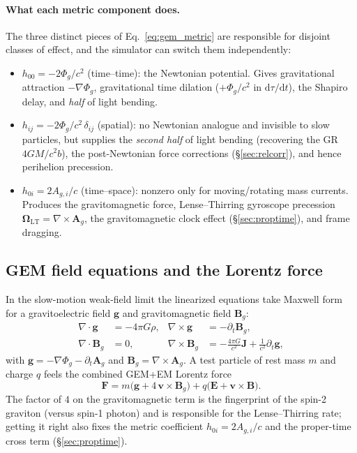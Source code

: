 \documentclass[11pt]{article}
\newcommand{\Phig}{\Phi_g}                 %
\newcommand{\Ag}{\mathbf{A}_g}             %
\newcommand{\vv}[1]{\mathbf{#1}}           %
\newcommand{\dd}{\mathrm{d}}               %
\newcommand{\Bg}{\vv{B}_g}
\begin{document}
\paragraph{What each metric component does.}
The three distinct pieces of Eq.~\eqref{eq:gem_metric} are responsible for
disjoint classes of effect, and the simulator can switch them independently:
\begin{itemize}
  \item $h_{00}=-2\Phig/c^2$ (time--time): the Newtonian potential. Gives
  gravitational attraction $-\nabla\Phig$, gravitational time dilation
  ($+\Phig/c^2$ in $\dd\tau/\dd t$), the Shapiro delay, and \emph{half} of
  light bending.
  \item $h_{ij}=-2\Phig/c^2\,\delta_{ij}$ (spatial): no Newtonian analogue and
  invisible to slow particles, but supplies the \emph{second half} of light
  bending (recovering the GR $4GM/c^2 b$), the post-Newtonian force corrections
  (\S\ref{sec:relcorr}), and hence perihelion precession.
  \item $h_{0i}=2A_{g,i}/c$ (time--space): nonzero only for moving/rotating
  mass currents. Produces the gravitomagnetic force, Lense--Thirring gyroscope
  precession $\boldsymbol\Omega_{\mathrm{LT}}=\nabla\times\Ag$, the
  gravitomagnetic clock effect (\S\ref{sec:proptime}), and frame dragging.
\end{itemize}

\subsection{GEM field equations and the Lorentz force}

In the slow-motion weak-field limit the linearized equations take Maxwell form
for a gravitoelectric field $\vv{g}$ and gravitomagnetic field $\Bg$:
\begin{align}
  \nabla\cdot\vv{g}   &= -4\pi G\rho, &
  \nabla\times\vv{g}  &= -\partial_t\Bg, \\
  \nabla\cdot\Bg      &= 0, &
  \nabla\times\Bg     &= -\frac{4\pi G}{c^2}\vv{J} + \frac{1}{c^2}\partial_t\vv{g},
\end{align}
with $\vv{g}=-\nabla\Phig-\partial_t\Ag$ and $\Bg=\nabla\times\Ag$.  A test
particle of rest mass $m$ and charge $q$ feels the combined GEM+EM Lorentz
force
\begin{equation}
\label{eq:lorentz_fields}
  \vv{F} = m\bigl(\vv{g} + 4\,\vv{v}\times\Bg\bigr)
         + q\bigl(\vv{E} + \vv{v}\times\vv{B}\bigr).
\end{equation}
The factor of $4$ on the gravitomagnetic term is the fingerprint of the spin-2
graviton (versus spin-1 photon) and is responsible for the Lense--Thirring
rate; getting it right also fixes the metric coefficient $h_{0i}=2A_{g,i}/c$ and
the proper-time cross term (\S\ref{sec:proptime}).
\end{document}
